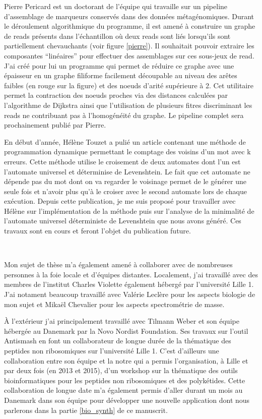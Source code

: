 Pierre Pericard est un doctorant de l'équipe qui travaille sur un pipeline d'assemblage de marqueurs conservés dans des données métagénomiques.
Durant le déroulement algorithmique du programme, il est amené à construire un graphe de reads présents dans l'échantillon où deux reads sont liés lorsqu'ils sont partiellement chevauchants (voir figure \ref{pierre}).
Il souhaitait pouvoir extraire les composantes ``linéaires'' pour effectuer des assemblages sur ces sous-jeux de read.
J'ai créé pour lui un programme qui permet de réduire ce graphe avec une épaisseur en un graphe filiforme facilement découpable au niveau des arêtes faibles (en rouge sur la figure) et des noeuds d'arité supérieure à 2.
Cet utilitaire permet la contraction des noeuds proches via des distances calculées par l'algorithme de Dijkstra ainsi que l'utilisation de plusieurs fitres discriminant les reads ne contribuant pas à l'homogénéité du graphe.
Le pipeline complet sera prochainement publié par Pierre.

En début d'année, Hélène Touzet a pulié un article contenant une méthode de programmation dynamique permettant le comptage des voisins d'un mot avec k erreurs.
Cette méthode utilise le croisement de deux automates dont l'un est l'automate universel et déterminise de Levenshtein.
Le fait que cet automate ne dépende pas du mot dont on va regarder le voisinage permet de le générer une seule fois et n'avoir plus qu'à le croiser avec le second automate lors de chaque exécution.
Depuis cette publication, je me suis proposé pour travailler avec Hélène sur l'implémentation de la méthode puis sur l'analyse de la minimalité de l'automate universel déterministe de Levenshtein que nous avons généré.
Ces travaux sont en cours et feront l'objet du publication future.

~~

Mon sujet de thèse m'a également amené à collaborer avec de nombreuses personnes à la foie locale et d'équipes distantes.
Localement, j'ai travaillé avec des membres de l'institut Charles Violette également hébergé par l'université Lille 1.
J'ai notament beaucoup travaillé avec Valérie Leclère pour les aspects biologie de mon sujet et Mikaël Chevalier pour les aspects spectrométrie de masse.

À l'extérieur j'ai principalement travaillé avec Tilmann Weber et son équipe hébergée au Danemark par la Novo Nordist Foundation.
Ses travaux sur l'outil Antismash en font un collaborateur de longue durée de la thématique des peptides non ribosomiques sur l'université Lille 1.
C'est d'ailleurs une collaboration entre son équipe et la notre qui a permis l'organisation, à Lille et par deux fois (en 2013 et 2015), d'un workshop sur la thématique des outils bioinformatiques pour les peptides non ribosomiques et des polykétides.
Cette collaboration de longue date m'a également permis d'aller durant un mois au Danemark dans son équipe pour développer une nouvelle application dont nous parlerons dans la partie \ref{bio_synth} de ce manuscrit.

